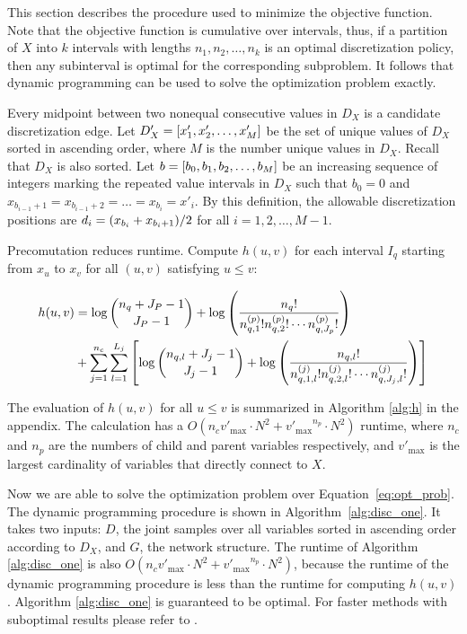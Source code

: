 This section describes the procedure used to minimize the objective function.
Note that the objective function is cumulative over intervals, thus, if a partition of $X$ into $k$ intervals with lengths $n_1,n_2,\ldots,n_k$ is an optimal discretization policy, then any subinterval is optimal for the corresponding subproblem.
It follows that dynamic programming can be used to solve the optimization problem exactly.

Every midpoint between two nonequal consecutive values in $D_X$ is a candidate discretization edge.
Let ${D'_X} = \brock{x'_1,x'_2,\ldots,x'_M}$ be the set of unique values of $D_X$ sorted in ascending order, where $M$ is the number unique values in $D_X$.
Recall that $D_X$ is also sorted.
Let $b = \brock{b_0,b_1,b_2,\ldots,b_M}$ be an increasing sequence of integers marking the repeated value intervals in $D_X$ such that $b_0 = 0$ and $x_{b_{i-1} + 1} = x_{b_{i-1} + 2} = \ldots = x_{b_i} = x'_i$.
By this definition, the allowable discretization positions are $d_i = \paren{x_{b_{i}} + x_{{b_i}+1}}/2$ for all $i = 1,2,\ldots,M-1$.

Precomutation reduces runtime.
Compute $h(u,v)$ for each interval $I_q$ starting from $x_{u}$ to $x_{v}$ for all $(u,v)$ satisfying $u \leq v$:

\begin{small}
\begin{equation}
\begin{aligned}
h(u,v) &=  \log {{n_{q} + J_P - 1}\choose{J_P-1}} + \log \left( { {{n_q}!}\over{ {n^{(p)}_{q,1} !} {n^{(p)}_{q,2} !} \cdots {n^{(p)}_{q,J_p} !}} } \right) \\
& + \sum_{j=1}^{n_c} \sum_{l=1}^{L_j} \left[  \log{{n_{q,l} + J_j - 1}\choose{J_j-1}} + \log \left( { {{n_{q,l}}!}\over{ {n^{(j)}_{q,1,l} !} {n^{(j)}_{q,2,l} !} \cdots {n^{(j)}_{q,J_j,l} !}} } \right) \right]
\end{aligned}
\end{equation}
\end{small}

The evaluation of $h(u,v)$ for all $u \leq v$ is summarized in Algorithm \ref{alg:h} in the appendix.
The calculation has a $O(n_c  {v'_\text{max}} \cdot N^2 + {v'_\text{max}}^{n_p} \cdot N^2)$ runtime, where $n_c$ and $n_p$ are the numbers of child and parent variables respectively, and $v'_\text{max}$ is the largest cardinality of variables that directly connect to $X$.

Now we are able to solve the optimization problem over Equation~\ref{eq:opt_prob}.
The dynamic programming procedure is shown in Algorithm~\ref{alg:disc_one}.
It takes two inputs: $D$, the joint samples over all variables sorted in ascending order according to $D_X$, and $G$, the network structure.
The runtime of Algorithm \ref{alg:disc_one} is also $O(n_c  {v'_\text{max}} \cdot N^2 + {v'_\text{max}}^{n_p} \cdot N^2)$, because the runtime of the dynamic programming procedure is less than the runtime for computing $h(u,v)$.
Algorithm \ref{alg:disc_one} is guaranteed to be optimal.
For faster methods with suboptimal results please refer to \citep{Boulle_2006}.

